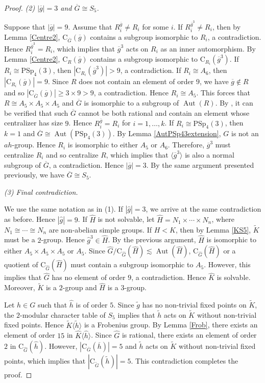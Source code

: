 \documentclass[11pt]{article}
\providecommand{\PSp}{{\mathrm{PSp}}}
\providecommand{\C}{{\mathrm{C}}}
\providecommand{\Aut}{{\operatorname{Aut}}}
\providecommand{\gen}[1]{\langle #1 \rangle} %
\providecommand{\gen}[1]{\langle #1 \rangle} %
\providecommand{\gen}[1]{\langle #1 \rangle} %
\providecommand{\olg}{{\overline{g}}}
\providecommand{\olh}{{\overline{h}}}
\providecommand{\olG}{{\overline{G}}}
\providecommand{\wtg}{{\widetilde{g}}}
\providecommand{\wth}{{\widetilde{h}}}
\providecommand{\wtG}{{\widetilde{G}}}
\providecommand{\wtK}{{\widetilde{K}}}
\providecommand{\whg}{{\widehat{g}}}
\providecommand{\whh}{{\widehat{h}}}
\providecommand{\whG}{{\widehat{G}}}
\providecommand{\whH}{{\widehat{H}}}
\providecommand{\whK}{{\widehat{K}}}
\begin{document}
\begin{proof}
\medskip
{\sl (2) $|\olg|=3$ and $\olG\cong S_5$. }
    
    Suppose that $|\olg|=9$. 
    Assume that $R_i^{\olg}\neq R_i$ for some $i$.
    If $R_i^{\olg^3}\neq R_i$, then by Lemma \ref{Centre2},
    $\C_{\olG}(\olg)$ contains a subgroup isomorphic to $R_i$, a contradiction.
    Hence $R_i^{\olg^3}=R_i$, which implies that $\olg^3$ acts on $R_i$ as an inner automorphism.
    By Lemma \ref{Centre2}, $\C_{R}(\olg)$ contains a subgroup isomorphic to $\C_{R_i}(\olg^3)$.
    If $R_i\cong \PSp_4(3)$, then $|\C_{R_i}(\olg^3)|>9$, a contradiction.
    If $R_i\cong A_6$, then $|\C_{R_i}(\olg)|= 9$.
    Since $R$ does not contain an element of order $9$, 
    we have $\olg\notin R$ and so $|\C_{\olG}(\olg)|\geq 3\times 9 >9$, a contradiction.
    Hence $R_i\cong A_5$.
    This forces that $R\cong A_5\times A_5\times A_5$ 
    and $\olG$ is isomorphic to a subgroup of $\Aut(R)$.
    By \cite[Code 5]{Git}, 
	    it can be verified that such $\olG$ cannot be both rational and contain an element whose centralizer has size $9$.
    Hence $R_i^{\olg}=R_i$ for $i=1,\ldots,k$.
    If $R_i\cong \PSp_4(3)$, then $k=1$ and $\olG\cong \Aut(\PSp_4(3))$.
    By Lemma \ref{AutPSp43extension}, $G$ is not an $ah$-group.
    Hence $R_i$ is isomorphic to either $A_5$ or $A_6$.
    Therefore, $\olg^3$ must centralize $R_i$ and so centralize $R$,
    which implies that $\gen{\olg^3}$ is also a normal subgroup of $\olG$,
	    a contradiction.
    Hence $|\olg|=3$.
    By the same argument presented previously, we have $\olG\cong S_5$.

\medskip
{\sl (3) Final contradiction.}

    We use the same notation as in (1).
    If $|\whg|=3$, we arrive at the same contradiction as before.
    Hence $|\whg|=9$.
	If $\whH$ is not solvable, let $\whH = N_1\times \cdots \times N_n$,
    where $N_1\cong \cdots \cong N_n$ are non-abelian simple groups.
    If $H<K$, then by Lemma \ref{KS5}, $\wtK$ must be a $2$-group.
    Hence $\whg^3\in \whH$.
    By the previous argument, $\whH$ is isomorphic to either
    $A_5\times A_5\times A_5$ or $A_5$.
    Since $\whG/\C_{\whG}(\whH)\lesssim \Aut(\whH)$, 
    $\C_{\whG}(\whH)$ or a quotient of $\C_{\whG}(\whH)$ must contain a subgroup isomorphic to $A_5$.
    However, this implies that $\whG$ has no element of order $9$, a contradiction.
    Hence $\whK$ is solvable.
    Moreover, $\wtK$ is a $2$-group and $\whH$ is a $3$-group.

    Let $h\in G$ such that $\whh$ is of order $5$.
    Since $\wtg$ has no non-trivial fixed points on $\wtK$, 
    the $2$-modular character table of $S_5$ implies that $\wth$ acts on $\wtK$ without
    non-trivial fixed points.
    Hence $\wtK \gen{\wth}$ is a Frobenius group.
    By Lemma \ref{Frob}, there exists an element of order $15$ in $\whK\gen{\whh}$.
    Since $\whG$ is rational, there exists an element of order $2$ in $\C_{\whG}(\whh)$.
    However, $|\C_{\olG}(\olh)|=5$ and $\wth$ acts on $\wtK$ without non-trivial fixed points, which implies that $|\C_{\wtG}(\wth)|=5$.
    This contradiction completes the proof.
\end{proof}
\end{document}
